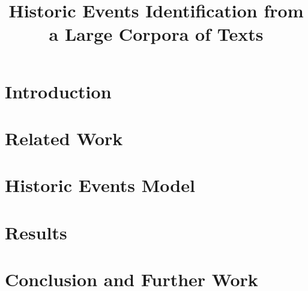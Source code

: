 \documentclass[11pt]{article}
\title{Historic Events Identification from a Large Corpora of Texts}
\date{}
\begin{document}
\maketitle

\begin{abstract}

\end{abstract}

\section{Introduction}
\label{sec:introduction}


\section{Related Work}
\label{sec:relatedwork}


\section{Historic Events Model}
\label{sec:model}


%

\section{Results}
\label{sec:results}


\section{Conclusion and Further Work}
\label{sec:conclusion}






\end{document}
